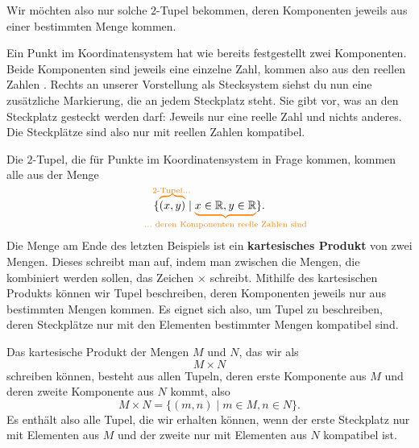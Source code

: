 \documentclass[../../main.tex]{subfiles}
\begin{document}
Wir möchten also nur solche $2$-Tupel bekommen, deren Komponenten jeweils aus einer bestimmten Menge kommen.

\begin{example}{}
    Ein Punkt im Koordinatensystem hat wie bereits festgestellt zwei Komponenten. Beide Komponenten sind jeweils eine einzelne Zahl, kommen also aus den reellen Zahlen \Real. Rechts an unserer Vorstellung als Stecksystem siehst du nun eine zusätzliche Markierung, die an jedem Steckplatz steht. Sie gibt vor, was an den Steckplatz gesteckt werden darf: Jeweils nur eine reelle Zahl und nichts anderes. Die Steckplätze sind also nur mit reellen Zahlen kompatibel.

    Die $2$-Tupel, die für Punkte im Koordinatensystem in Frage kommen, kommen alle aus der Menge
    \[\{\colorobrace{(x,y)}{\text{2-Tupel}\dots}\mid \colorbrace{x\in\Real,y\in\Real}{\dots\text{~deren~Komponenten~reelle~Zahlen~sind}}\}.\]
\end{example}

Die Menge am Ende des letzten Beispiels ist ein \textbf{kartesisches Produkt} von zwei Mengen. Dieses schreibt man auf, indem man zwischen die Mengen, die kombiniert werden sollen, das Zeichen $\times$ schreibt. Mithilfe des kartesischen Produkts können wir Tupel beschreiben, deren Komponenten jeweils nur aus bestimmten Mengen kommen. Es eignet sich also, um Tupel zu beschreiben, deren Steckplätze nur mit den Elementen bestimmter Mengen kompatibel sind.

Das kartesische Produkt der Mengen $M$ und $N$, das wir als 
\[M \times N\]
schreiben können, besteht aus allen Tupeln, deren erste Komponente aus $M$ und deren zweite Komponente aus $N$ kommt, also
\[M \times N=\{(m,n) \mid m\in M, n\in N\}.\]
Es enthält also alle Tupel, die wir erhalten können, wenn der erste Steckplatz nur mit Elementen aus $M$ und der zweite nur mit Elementen aus $N$ kompatibel ist.
\end{document}
